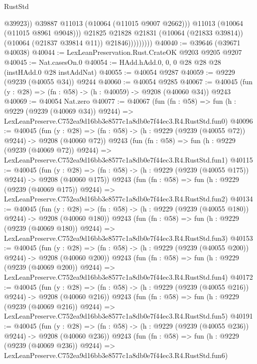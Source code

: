 \begin{lexlean}{RustStd}
\begin{coremodule}
                              @39923))
                          @39887
                          @11013
                          (@10064 (@11015 @9007 @2662)))
                        @11013
                        (@10064 (@11015 @8961 @9048)))
                      @21825
                      @21828
                      @21831
                      (@10064 (@21833 @39814))
                      (@10064 (@21837 @39814 @11))
                      @21846)))))))))
@40040 := @39646 (@39671 @40038)
@40044 := LexLeanPreservation.Rust.CrateOK @9203 @9205 @9207
@40045 := Nat.casesOn.{0}
@40054 := HAdd.hAdd.{0, 0, 0} @28 @28 @28 (instHAdd.{0} @28 instAddNat)
@40055 := @40054 @9287
@40059 := @9229 (@9239 (@40055 @34)) @9244
@40060 := @40054 @9285
@40067 := @40045 (fun (y : @28) => (fn : @58) -> (h : @40059) -> @9208 (@40060 @34)) @9243
@40069 := @40054 Nat.zero
@40077 := @40067
    (fun (fn : @58) =>
    fun (h : @9229 (@9239 (@40069 @34)) @9244) =>
    LexLeanPreserve.C752ea9d16bb3e8577c1a8db0e7f44ec3.R4.RustStd.fun0)
@40096 := @40045
    (fun (y : @28) => (fn : @58) -> (h : @9229 (@9239 (@40055 @72)) @9244) -> @9208 (@40060 @72))
    @9243
    (fun (fn : @58) =>
    fun (h : @9229 (@9239 (@40069 @72)) @9244) =>
    LexLeanPreserve.C752ea9d16bb3e8577c1a8db0e7f44ec3.R4.RustStd.fun1)
@40115 := @40045
    (fun (y : @28) => (fn : @58) -> (h : @9229 (@9239 (@40055 @175)) @9244) -> @9208 (@40060 @175))
    @9243
    (fun (fn : @58) =>
    fun (h : @9229 (@9239 (@40069 @175)) @9244) =>
    LexLeanPreserve.C752ea9d16bb3e8577c1a8db0e7f44ec3.R4.RustStd.fun2)
@40134 := @40045
    (fun (y : @28) => (fn : @58) -> (h : @9229 (@9239 (@40055 @180)) @9244) -> @9208 (@40060 @180))
    @9243
    (fun (fn : @58) =>
    fun (h : @9229 (@9239 (@40069 @180)) @9244) =>
    LexLeanPreserve.C752ea9d16bb3e8577c1a8db0e7f44ec3.R4.RustStd.fun3)
@40153 := @40045
    (fun (y : @28) => (fn : @58) -> (h : @9229 (@9239 (@40055 @200)) @9244) -> @9208 (@40060 @200))
    @9243
    (fun (fn : @58) =>
    fun (h : @9229 (@9239 (@40069 @200)) @9244) =>
    LexLeanPreserve.C752ea9d16bb3e8577c1a8db0e7f44ec3.R4.RustStd.fun4)
@40172 := @40045
    (fun (y : @28) => (fn : @58) -> (h : @9229 (@9239 (@40055 @216)) @9244) -> @9208 (@40060 @216))
    @9243
    (fun (fn : @58) =>
    fun (h : @9229 (@9239 (@40069 @216)) @9244) =>
    LexLeanPreserve.C752ea9d16bb3e8577c1a8db0e7f44ec3.R4.RustStd.fun5)
@40191 := @40045
    (fun (y : @28) => (fn : @58) -> (h : @9229 (@9239 (@40055 @236)) @9244) -> @9208 (@40060 @236))
    @9243
    (fun (fn : @58) =>
    fun (h : @9229 (@9239 (@40069 @236)) @9244) =>
    LexLeanPreserve.C752ea9d16bb3e8577c1a8db0e7f44ec3.R4.RustStd.fun6)

\end{coremodule}
\end{lexlean}
